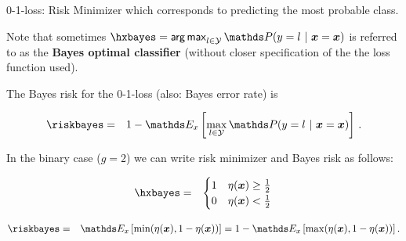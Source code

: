 \begin{vbframe}{0-1-loss: Risk Minimizer}
which corresponds to predicting the most probable class. 

\vspace*{0.2cm} 

Note that sometimes $\hxbayes = \argmax_{l \in \Yspace} \P(y = l~|~ \xv = \xv)$ is referred to as the \textbf{Bayes optimal classifier} (without closer specification of the the loss function used). 

\lz 

The Bayes risk for the 0-1-loss (also: Bayes error rate) is 

\begin{eqnarray*}  
  \riskbayes &=& 1 - \E_x \left[\max_{l \in \Yspace} \P(y = l~|~ \xv = \xv)\right]\,.
\end{eqnarray*}

\lz 

In the binary case ($g = 2$) we can write risk minimizer and Bayes risk as follows:  

\begin{eqnarray*}
  \hxbayes &=& \begin{cases} 1 & \eta(\xv) \ge \frac{1}{2} \\ 0 & \eta(\xv) < \frac{1}{2}\end{cases} \\
\end{eqnarray*}

\vspace*{-0.7cm}

\begin{eqnarray*}
  \riskbayes &=& \E_x\left[\min(\eta(\xv), 1 - \eta(\xv))\right] = 1 - \E_x\left[\max(\eta(\xv), 1 - \eta(\xv))\right] . 
\end{eqnarray*}











\end{vbframe}
